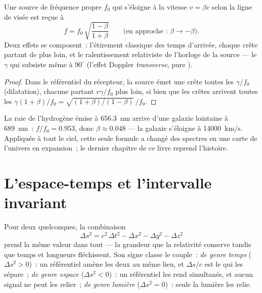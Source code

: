 \begin{proposition}\label{prop:b3:relativistic-kinematics:doppler}
Une source de fréquence propre $f_0$ qui s'éloigne à la vitesse
$v = \beta c$ selon la ligne de visée est reçue à
\[
f = f_0\,\sqrt{\frac{1 - \beta}{1 + \beta}}
\qquad
\text{(en approche~: } \beta \to -\beta\text{)} .
\]
Deux effets se composent~: l'étirement classique des temps d'arrivée,
chaque crête partant de plus loin, et le ralentissement relativiste de
l'horloge de la source --- le $\gamma$ qui subsiste même à $90^\circ$
(l'effet Doppler \emph{transverse}, pure ).
\end{proposition}

\begin{proof}
Dans le référentiel du récepteur, la source émet une crête toutes les
$\gamma/f_0$ (dilatation), chacune partant $v\gamma/f_0$ plus loin,
si bien que les crêtes arrivent toutes les $\gamma(1 + \beta)/f_0 = \sqrt{(1+\beta)/
(1-\beta)}\,/f_0$.
\end{proof}

\begin{example}\label{ex:b3:relativistic-kinematics:redshift}
La raie de l'hydrogène émise à \qty{656.3}{nm} arrive d'une galaxie
lointaine à \qty{689}{nm}~: $f/f_0 = 0.953$, donc $\beta \approx 0.048$
--- la galaxie s'éloigne à \qty{14000}{km/s}. Appliquée à tout le ciel,
cette seule formule a changé des spectres en une carte de l'univers en
expansion~; le dernier chapitre de ce livre reprend l'histoire.
\end{example}

\section{L'espace-temps et l'intervalle invariant}

\begin{theorem}\label{thm:b3:relativistic-kinematics:interval}
Pour deux  quelconques, la combinaison
\[
\Delta s^2 = c^2\,\Delta t^2 - \Delta x^2 - \Delta y^2 - \Delta z^2
\]
prend la même valeur dans tout  --- la grandeur que
la relativité conserve tandis que temps et longueurs fléchissent. Son
signe classe le couple~: \emph{de genre temps} ($\Delta s^2 > 0$)~: un
référentiel amène les deux  au même lieu, et $\Delta s/c$ est
le  qui les sépare~; \emph{de genre espace}
($\Delta s^2 < 0$)~: un référentiel les rend simultanés, et aucun signal
ne peut les relier~; \emph{de genre lumière} ($\Delta s^2 = 0$)~: seule
la lumière les relie.
\end{theorem}

